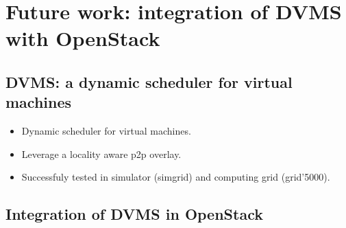 \section{Future work: integration of DVMS with OpenStack}
\label{sec:future_work}

\subsection{DVMS: a dynamic scheduler for virtual machines}

\begin{itemize}

	\item Dynamic scheduler for virtual machines.

	\item Leverage a locality aware p2p overlay.

	\item Successfuly tested in simulator (simgrid) and computing grid (grid'5000).

\end{itemize}


\subsection{Integration of DVMS in OpenStack}

\label{sub:sec:integration_dvms}

